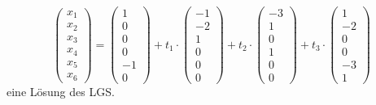 $$
	\begin{pmatrix}
		x_1\\
		x_2\\
		x_3\\
		x_4\\
		x_5\\
		x_6
	\end{pmatrix}
	=
	\begin{pmatrix}
		1\\
		0\\
		0\\
		0\\
		-1\\
		0
	\end{pmatrix}
	+
	t_1 \cdot
	\begin{pmatrix}
		-1\\
		-2\\
		1\\
		0\\
		0\\
		0
	\end{pmatrix}	
	+t_2\cdot
	\begin{pmatrix}
		-3\\
		1\\
		0\\
		1\\
		0\\
		0
	\end{pmatrix}	
	+t_3\cdot
	\begin{pmatrix}
		1\\
		-2\\
		0\\
		0\\
		-3\\
		1
	\end{pmatrix}	
$$
eine L\"osung des LGS. \\

